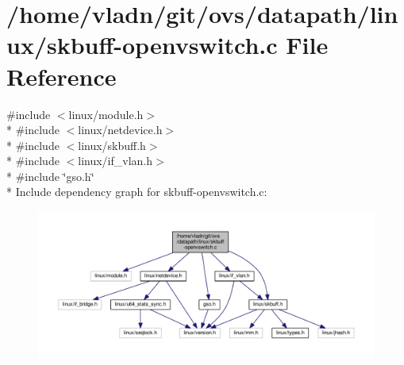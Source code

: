 \hypertarget{skbuff-openvswitch_8c}{}\section{/home/vladn/git/ovs/datapath/linux/skbuff-\/openvswitch.c File Reference}
\label{skbuff-openvswitch_8c}
{\ttfamily \#include $<$linux/module.\+h$>$}\\*
{\ttfamily \#include $<$linux/netdevice.\+h$>$}\\*
{\ttfamily \#include $<$linux/skbuff.\+h$>$}\\*
{\ttfamily \#include $<$linux/if\+\_\+vlan.\+h$>$}\\*
{\ttfamily \#include \char`\"{}gso.\+h\char`\"{}}\\*
Include dependency graph for skbuff-\/openvswitch.c\+:
\nopagebreak
\begin{figure}[H]
\begin{center}
\leavevmode
\includegraphics[width=350pt]{skbuff-openvswitch_8c__incl}
\end{center}
\end{figure}
